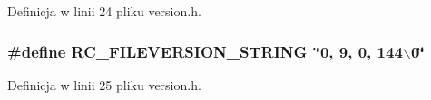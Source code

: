 Definicja w linii 24 pliku version.h.\hypertarget{a00017_4763e81d3c29ec0fab79225d3ec3f1a2}{
\subsubsection[{RC\_\-FILEVERSION\_\-STRING}]{\setlength{\rightskip}{0pt plus 5cm}\#define RC\_\-FILEVERSION\_\-STRING~\char`\"{}0, 9, 0, 144$\backslash$0\char`\"{}}}
\label{d4/d51/a00017_4763e81d3c29ec0fab79225d3ec3f1a2}




Definicja w linii 25 pliku version.h.